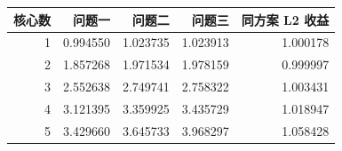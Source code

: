 \begin{tabular}{rrrrr}
\toprule
核心数 & 问题一 & 问题二 & 问题三 & 同方案 L2 收益 \\
\midrule
1 & 0.994550 & 1.023735 & 1.023913 & 1.000178 \\
2 & 1.857268 & 1.971534 & 1.978159 & 0.999997 \\
3 & 2.552638 & 2.749741 & 2.758322 & 1.003431 \\
4 & 3.121395 & 3.359925 & 3.435729 & 1.018947 \\
5 & 3.429660 & 3.645733 & 3.968297 & 1.058428 \\
\bottomrule
\end{tabular}

